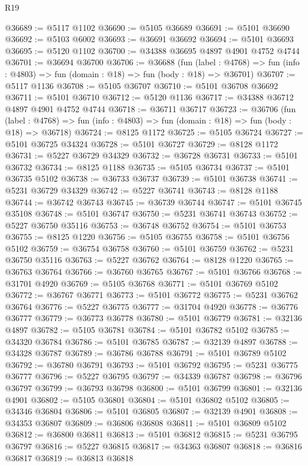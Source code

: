 \begin{lexlean}{R19}
\begin{coremodule}
{{{{{{{{{{{@36689 := @5117 @1102
@36690 := @5105 @36689
@36691 := @5101 @36690
@36692 := @5103 @6002
@36693 := @36691 @36692
@36694 := @5101 @36693
@36695 := @5120 @1102
@36700 := @34388 @36695 @4897 @4901 @4752 @4744
@36701 := @36694 @36700
@36706 := @36688
    (fun (label : @4768) => fun (info : @4803) => fun (domain : @18) => fun (body : @18) => @36701)
@36707 := @5117 @1136
@36708 := @5105 @36707
@36710 := @5101 @36708 @36692
@36711 := @5101 @36710
@36712 := @5120 @1136
@36717 := @34388 @36712 @4897 @4901 @4752 @4744
@36718 := @36711 @36717
@36723 := @36706
    (fun (label : @4768) => fun (info : @4803) => fun (domain : @18) => fun (body : @18) => @36718)
@36724 := @8125 @1172
@36725 := @5105 @36724
@36727 := @5101 @36725 @34324
@36728 := @5101 @36727
@36729 := @8128 @1172
@36731 := @5227 @36729 @34329
@36732 := @36728 @36731
@36733 := @5101 @36732
@36734 := @8125 @1188
@36735 := @5105 @36734
@36737 := @5101 @36735 @5102
@36738 := @36733 @36737
@36739 := @5101 @36738
@36741 := @5231 @36729 @34329
@36742 := @5227 @36741
@36743 := @8128 @1188
@36744 := @36742 @36743
@36745 := @36739 @36744
@36747 := @5101 @36745 @35108
@36748 := @5101 @36747
@36750 := @5231 @36741 @36743
@36752 := @5227 @36750 @35116
@36753 := @36748 @36752
@36754 := @5101 @36753
@36755 := @8125 @1220
@36756 := @5105 @36755
@36758 := @5101 @36756 @5102
@36759 := @36754 @36758
@36760 := @5101 @36759
@36762 := @5231 @36750 @35116
@36763 := @5227 @36762
@36764 := @8128 @1220
@36765 := @36763 @36764
@36766 := @36760 @36765
@36767 := @5101 @36766
@36768 := @31701 @4920
@36769 := @5105 @36768
@36771 := @5101 @36769 @5102
@36772 := @36767 @36771
@36773 := @5101 @36772
@36775 := @5231 @36762 @36764
@36776 := @5227 @36775
@36777 := @31704 @4920
@36778 := @36776 @36777
@36779 := @36773 @36778
@36780 := @5101 @36779
@36781 := @32136 @4897
@36782 := @5105 @36781
@36784 := @5101 @36782 @5102
@36785 := @34320 @36784
@36786 := @5101 @36785
@36787 := @32139 @4897
@36788 := @34328 @36787
@36789 := @36786 @36788
@36791 := @5101 @36789 @5102
@36792 := @36780 @36791
@36793 := @5101 @36792
@36795 := @5231 @36775 @36777
@36796 := @5227 @36795
@36797 := @34339 @36787
@36798 := @36796 @36797
@36799 := @36793 @36798
@36800 := @5101 @36799
@36801 := @32136 @4901
@36802 := @5105 @36801
@36804 := @5101 @36802 @5102
@36805 := @34346 @36804
@36806 := @5101 @36805
@36807 := @32139 @4901
@36808 := @34353 @36807
@36809 := @36806 @36808
@36811 := @5101 @36809 @5102
@36812 := @36800 @36811
@36813 := @5101 @36812
@36815 := @5231 @36795 @36797
@36816 := @5227 @36815
@36817 := @34363 @36807
@36818 := @36816 @36817
@36819 := @36813 @36818
}}}}}}}}}}}
\end{coremodule}
\end{lexlean}
